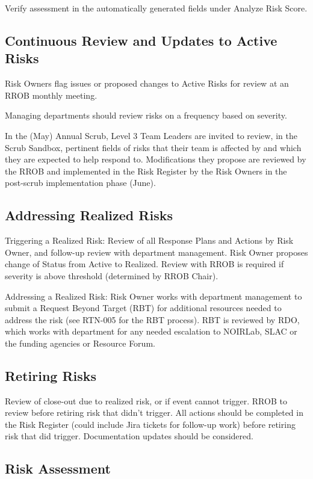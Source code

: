 Verify assessment in the automatically generated fields under Analyze Risk Score.

\subsection{Continuous Review and Updates to Active Risks}

Risk Owners flag issues or proposed changes to Active Risks for review at an RROB monthly meeting.

Managing departments should review risks on a frequency based on severity.

In the (May) Annual Scrub, Level 3 Team Leaders are invited to review, in the Scrub Sandbox, pertinent fields of risks that their team is affected by and which they are expected to help respond to.
Modifications they propose are reviewed by the RROB and implemented in the Risk Register by the Risk Owners in the post-scrub implementation phase (June).

\subsection{Addressing Realized Risks}

Triggering a Realized Risk:
Review of all Response Plans and Actions by Risk Owner, and follow-up review with department management.
Risk Owner proposes change of Status from Active to Realized.
Review with RROB is required if severity is above threshold (determined by RROB Chair).

Addressing a Realized Risk:
Risk Owner works with department management to submit a Request Beyond Target (RBT) for additional resources needed to address the risk (see RTN-005 for the RBT process).
RBT is reviewed by RDO, which works with department for any needed escalation to NOIRLab, SLAC or the funding agencies or Resource Forum.

\subsection{Retiring Risks}

Review of close-out due to realized risk, or if event cannot trigger.
RROB to review before retiring risk that didn't trigger.
All actions should be completed in the Risk Register (could include Jira tickets for follow-up work) before retiring risk that did trigger.
Documentation updates should be considered.

\subsection{Risk Assessment}

